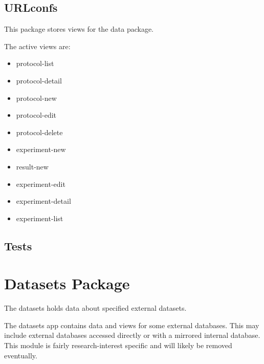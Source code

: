 \documentclass[letterpaper,10pt,english]{sphinxmanual}
\begin{document}
\subsection{URLconfs}
\label{api:urlconfs}\label{api:module-experimentdb.data.urls}
This package stores views for the data package.


The active views are:

\begin{itemize}
\item {} 
protocol-list


\item {} 
protocol-detail


\item {} 
protocol-new


\item {} 
protocol-edit


\item {} 
protocol-delete


\item {} 
experiment-new


\item {} 
result-new


\item {} 
experiment-edit


\item {} 
experiment-detail


\item {} 
experiment-list


\end{itemize}


\subsection{Tests}
\label{api:tests}

\section{Datasets Package}
\label{api:datasets-package}\label{api:module-experimentdb.datasets}
The datasets holds data about specified external datasets.


The datasets app contains data and views for some external databases.  This may include external databases accessed directly or with a mirrored internal database.  This module is fairly research-interest specific and will likely be removed eventually.
\end{document}
